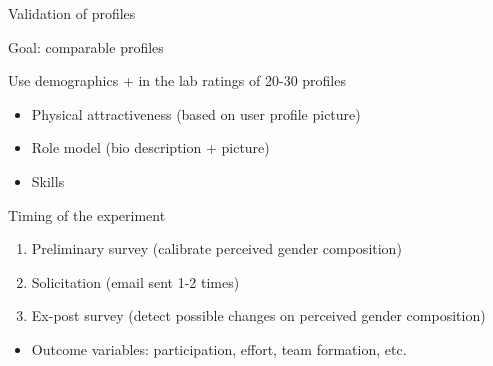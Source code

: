 \begin{frame}{Validation of profiles}

Goal: comparable profiles

Use demographics + in the lab ratings of 20-30 profiles

\begin{itemize}
\tightlist
\item
  Physical attractiveness (based on user profile picture)
\item
  Role model (bio description + picture)
\item
  Skills
\end{itemize}

\end{frame}

\begin{frame}{Timing of the experiment}

\begin{enumerate}
\def\labelenumi{\arabic{enumi}.}
\tightlist
\item
  Preliminary survey (calibrate perceived gender composition)
\item
  Solicitation (email sent 1-2 times)
\item
  Ex-post survey (detect possible changes on perceived gender
  composition)
\end{enumerate}

\begin{itemize}
\tightlist
\item
  Outcome variables: participation, effort, team formation, etc.
\end{itemize}

\end{frame}

